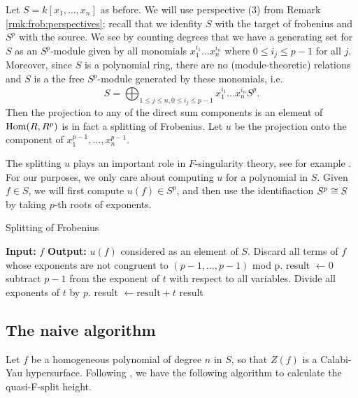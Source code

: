 Let \(S = k[x_{1}, \ldots, x_{n}]\) as before. 
We will use perspective (3) from
Remark \ref{rmk:frob:perspectives}; 
recall that we idenfity 
\(S\) with the target of frobenius and
\(S^{p}\) with the source.
We see 
by counting degrees
that we have a generating set for \(S\) as an
\(S^{p}\)-module given by
all monomials
\(x_{1}^{i_{1}}\ldots x_{n}^{i_{n}}\)
where \(0 \leq i_{j} \leq p-1\) for all \(j\).
Moreover, since \(S\) is a polynomial ring, 
there are no (module-theoretic) relations
and
\(S\) is a the free \(S^{p}\)-module generated by 
these monomials, i.e.  \[
S = \bigoplus_{1 \leq j \leq n, 0 \leq i_{j} \leq p-1}^{} x_{1}^{i_{1}}\ldots x_{n}^{i_{n}} S^{p}
.\] 
Then the projection to any of the direct sum components
is an element of \(\operatorname{Hom}(R,R^{p})\) is in fact a
splitting of Frobenius.
Let \(u\) be the projection onto the component of
\(x_{1}^{p-1}, \ldots, x_{n}^{p-1}\).

The splitting \(u\) plays an important role in \(F\)-singularity
theory, see for example 
\cite[Claim~2.6]{ma-polstra-2021-F-sing-comm-alg}.
For our purposes, we only care about computing \(u\) 
for a polynomial in \(S\). 
Given \(f \in S\), we will first compute
\(u(f) \in S^{p}\), and then use the identifiaction
\(S^{p} \cong S\) by taking \(p\)-th roots of 
exponents.

\begin{algorithm}[H]
\caption{Splitting of Frobenius}
\label{alg:naive:u}
\begin{algorithmic}[1]
\State \textbf{Input:} \(f\) 
\State \textbf{Output:} \(u(f)\) considered as an element of \(S\).
\State Discard all terms of \(f\) whose exponents are not congruent to
	\((p-1, \ldots, p-1)\) mod p.
\State result \(\gets 0\)	
    \State subtract \(p-1\) from the exponent of 
	    \(t\) with respect to all variables.
    \State Divide all exponents of \(t\) by \(p\).
    \State result \(\gets \text{result} + t\)
\EndFor 
\State \Return result
\end{algorithmic}
\end{algorithm}


\subsection{The naive algorithm}

Let \(f\) be a homogeneous polynomial of degree \(n\) 
in \(S\), 
so that \(Z(f)\) is a Calabi-Yau hypersurface.
Following \cite{kty-2022-fedder}, we have the following
algorithm to calculate the quasi-F-split height.

